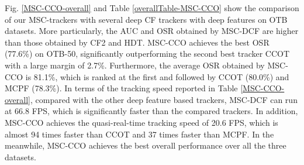 \documentclass[runningheads]{llncs}
\begin{document}


Fig. \ref{MSC-CCO-overall} and Table \ref{overallTable-MSC-CCO} show the comparison of our MSC-trackers with several deep CF trackers with deep features on OTB datasets. More particularly, the AUC and OSR obtained by MSC-DCF are higher than those obtained by CF2 and HDT. MSC-CCO achieves the best OSR (77.6\%) on OTB-50, significantly outperforming the second best tracker CCOT with a large margin of 2.7\%. Furthermore, the average OSR obtained by MSC-CCO is 81.1\%, which is ranked at the first and followed by CCOT (80.0\%) and MCPF (78.3\%).  In terms of the tracking speed reported in Table \ref{MSC-CCO-overall}, compared with the other deep feature based trackers, MSC-DCF can run at 66.8 FPS, which is significantly faster than the compared trackers. In addition, MSC-CCO achieves the quasi-real-time tracking speed of 20.6 FPS, which is almost 94 times faster than CCOT and 37 times faster than MCPF. In the meanwhile, MSC-CCO achieves the best overall performance over all the three datasets. %
\end{document}
